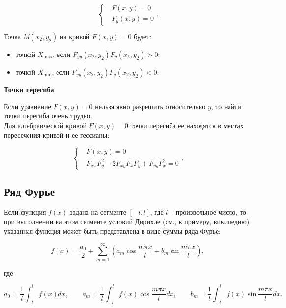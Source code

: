 \[
\begin{cases}
& F \left( x, y \right) = 0\\
& F_{y} \left( x, y \right) = 0
\end{cases}.
\]

Точка $M \left( x_{2}, y_{2} \right)$ на кривой $F \left( x, y \right) = 0$ будет:

\begin{itemize}
	\item точкой $X_{\max}$, если $F_{yy} \left( x_{2}, y_{2} \right) F_{y} \left( x_{2}, y_{2} \right) > 0$;
	
	\item точкой $X_{\min}$, если $F_{yy} \left( x_{2}, y_{2} \right) F_{y} \left( x_{2}, y_{2} \right) < 0$.
\end{itemize} 

\textbf{Точки перегиба}

Если уравнение $F \left( x, y \right) = 0$ нельзя явно разрешить относительно $y$, то найти точки перегиба очень трудно.\\

Для алгебраической кривой $F \left( x, y \right) = 0$ точки перегиба ее находятся в местах пересечения кривой и ее гессианы:

\[
\begin{cases}
& F \left( x, y \right) = 0\\
& F_{xx} F^{2}_{y} - 2 F_{xy} F_{x} F_{y} + F_{yy} F^{2}_{x} = 0
\end{cases}.
\]

\subsection{Ряд Фурье}

Если функция $f(x)$ задана на сегменте $[-l,l]$, где $l$ -- произвольное число, то при выполнении на этом сегменте условий Дирихле (см., к примеру, википедию) указанная функция может быть представлена в виде суммы ряда Фурье:

\[
f(x) = \frac{a_{0}}{2} + \sum_{m = 1}^{\infty} \left( a_{m} \cos \frac{m \pi x}{l} + b_{m} \sin \frac{m \pi x}{l} \right),
\]

где

\[
a_{0} =  \frac{1}{l} \int_{-l}^{l} f(x) dx, \qquad a_{m} = \frac{1}{l} \int_{-l}^{l} f(x) \cos \frac{m \pi x}{l} dx, \qquad b_{m} = \frac{1}{l} \int_{-l}^{l} f(x) \sin \frac{m \pi x}{l} dx.
\]